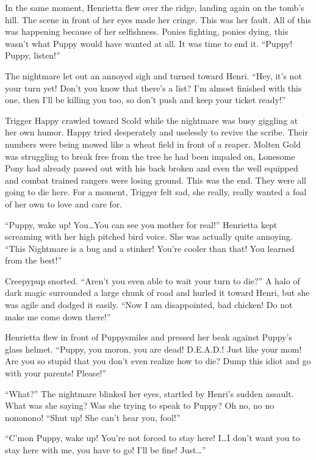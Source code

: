 In the same moment, Henrietta flew over the ridge, landing again on the tomb's hill. The scene in front of her eyes made her cringe. This was her fault. All of this was happening because of her selfishness. Ponies fighting, ponies dying, this wasn't what Puppy would have wanted at all. It was time to end it. ``Puppy! Puppy, listen!''

The nightmare let out an annoyed sigh and turned toward Henri. ``Hey, it's not your turn yet! Don't you know that there's a list? I'm almost finished with this one, then I'll be killing you too, so don't push and keep your ticket ready!''

Trigger Happy crawled toward Scold while the nightmare was busy giggling at her own humor. Happy tried desperately and uselessly to revive the scribe. Their numbers were being mowed like a wheat field in front of a reaper. Molten Gold was struggling to break free from the tree he had been impaled on, Lonesome Pony had already passed out with his back broken and even the well equipped and combat trained rangers were losing ground. This was the end. They were all going to die here. For a moment, Trigger felt sad, she really, really wanted a foal of her own to love and care for. 

``Puppy, wake up! You\dots You can see you mother for real!'' Henrietta kept screaming with her high pitched bird voice. She was actually quite annoying. ``This Nightmare is a bug and a stinker! You're cooler than that! You learned from the best!''

Creepypup snorted. ``Aren't you even able to wait your turn to die?'' A halo of dark magic surrounded a large chunk of road and hurled it toward Henri, but she was agile and dodged it easily. ``Now I am disappointed, bad chicken! Do not make me come down there!''

Henrietta flew in front of Puppysmiles and pressed her beak against Puppy's glass helmet. ``Puppy, you moron, you are dead! D.E.A.D.! Just like your mom! Are you so stupid that you don't even realize how to die? Dump this idiot and go with your parents! Please!''

``What?'' The nightmare blinked her eyes, startled by Henri's sudden assault. What was she saying? Was she trying to speak to Puppy? Oh no, no no nononono! ``Shut up! She can't hear you, fool!''

``C'mon Puppy, wake up! You're not forced to stay here! I\dots I don't want you to stay here with me, you have to go! I'll be fine! Just\dots''

